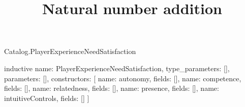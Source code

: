 \begin{lexlean}{Catalog.PlayerExperienceNeedSatisfaction}
\title{Natural number addition}
\begin{semanticmodule}
inductive{
  name: PlayerExperienceNeedSatisfaction,
  type_parameters: [],
  parameters: [],
  constructors: [
    {name: autonomy, fields: []},
    {name: competence, fields: []},
    {name: relatedness, fields: []},
    {name: presence, fields: []},
    {name: intuitiveControls, fields: []}
  ]
}
\end{semanticmodule}
\end{lexlean}
